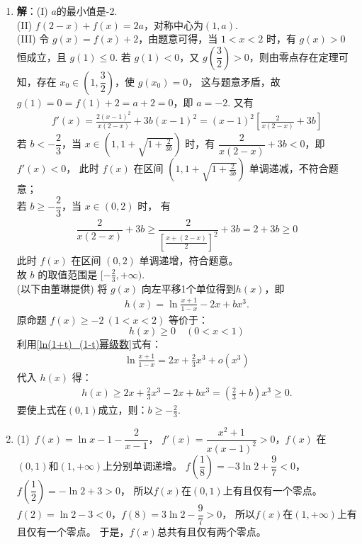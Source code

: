 \begin{enumerate}[label={\textbf{\thechapter.\arabic*}},leftmargin=
    \inteval{\myenumleftmargin}pt]
\item \textbf{解}：(I) $a$的最小值是-2. \\
(II) \(f(2-x)+f(x)=2a\)，对称中心为\((1,a)\). \\
(III) 令 \( g(x) = f(x) + 2 \)，由题意可得，当 \( 1 < x < 2 \) 时，有 \( g(x) > 0 \) 恒成立，且  
\( g(1) \leq 0 \). 若 \( g(1) < 0 \)，又 \( g\left(\dfrac{3}{2}\right) > 0 \)，则由零点存在定理可知，存在 \( x_0 \in \left(1, \dfrac{3}{2}\right) \)，使 \( g(x_0) = 0 \)，  
这与题意矛盾，故 \( g(1) = 0=f(1) + 2 = a + 2 = 0 \)，即 \( a = -2 \). 又有
\begin{gather*}
    f'(x) = \frac{2(x-1)^2}{x(2-x)} + 3b(x-1)^2 = (x-1)^2 \left[ \frac{2}{x(2-x)} + 3b \right] 
\end{gather*}
若 \( b < -\dfrac{2}{3} \)，当 \( x \in \left(1, 1+\sqrt{1+\frac{2}{3b}}\right) \) 时，有  
$\dfrac{2}{x(2-x)} + 3b < 0$，即 \( f'(x) < 0 \)，
此时 \( f(x) \) 在区间 \((1, 1+\sqrt{1+\frac{2}{3b}})\) 单调递减，不符合题意；\\
若 \( b \geq -\dfrac{2}{3} \)，当 \( x \in (0, 2) \) 时，
有
\begin{gather*}
    \dfrac{2}{x(2-x)} + 3b\geq \dfrac{2}{\left[
        \frac{x+(2-x)}{2}\right]^2}+3b=2+3b \geq 0
\end{gather*}
此时 \( f(x) \) 在区间 \((0, 2)\) 单调递增，符合题意。\\
故 \( b \) 的取值范围是 \([-\frac{2}{3}, +\infty)\). \\	
(以下由董琳提供)
将 $g(x)$ 向左平移1个单位得到$h(x)$，即
\begin{gather*}
    h(x) = \ln\frac{x+1}{1-x} - 2x + bx^3.
\end{gather*}
原命题 $f(x) \ge -2 \ (1<x<2)$ 等价于：
\[ h(x) \ge 0 \quad (0<x<1) \]
利用\eqref{ln(1+t)_(1-t)幂级数}式有：
\begin{gather*}
    \ln\frac{x+1}{1-x} = 2x + \frac{2}{3}x^3 + o(x^3)
\end{gather*}
代入 $h(x)$ 得：
\begin{align*}
    h(x) \ge 2x + \frac{2}{3}x^3 - 2x + bx^3 
    = \left( \frac{2}{3} + b \right) x^3 \geq 0.
\end{align*}
要使上式在$(0,1)$成立，则：$b \geq -\frac{2}{3}$.

\item (1)\ $ f(x)=\ln x-1-\dfrac{2}{x-1} $，
$ f'(x)=\dfrac{x^2+1}{x(x-1)^2}>0 $，$ f(x) $
在$ (0,1) $和$ (1,+\infty) $上分别单调递增。
$ f\left(\dfrac{1}{8}\right)=-3\ln 2+\dfrac{9}{7}<0 $，
$ f\left(\dfrac{1}{2}\right)=-\ln2+3>0 $，
所以$ f(x) $在$ (0,1) $上有且仅有一个零点。
$ f(2)=\ln 2-3<0 $，$ f(8)=3\ln 2-\dfrac{9}{7}>0 $，
所以$ f(x) $在$ (1,+\infty) $上有且仅有一个零点。
于是，$ f(x) $总共有且仅有两个零点。


\end{enumerate}
